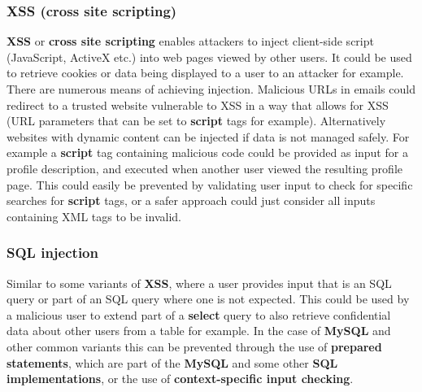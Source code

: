 \documentclass{article}
\newcommand{\np}{\vspace{8pt} \\}
\begin{document}
\subsubsection{XSS (cross site scripting)}
\textbf{XSS} or \textbf{cross site scripting} enables attackers to inject client-side script (JavaScript, ActiveX etc.) into web pages viewed by other users. It could be used to retrieve cookies or data being displayed to a user to an attacker for example. \np
There are numerous means of achieving injection. Malicious URLs in emails could redirect to a trusted website vulnerable to XSS in a way that allows for XSS (URL parameters that can be set to \textbf{script} tags for example). Alternatively websites with dynamic content can be injected if data is not managed safely. For example a \textbf{script} tag containing malicious code could be provided as input for a profile description, and executed when another user viewed the resulting profile page. This could easily be prevented by validating user input to check for specific searches for \textbf{script} tags, or a safer approach could just consider all inputs containing XML tags to be invalid.

\subsubsection{SQL injection}
Similar to some variants of \textbf{XSS}, where a user provides input that is an SQL query or part of an SQL query where one is not expected. This could be used by a malicious user to extend part of a \textbf{select} query to also retrieve confidential data about other users from a table for example. In the case of \textbf{MySQL} and other common variants this can be prevented through the use of \textbf{prepared statements}, which are part of the \textbf{MySQL} and some other \textbf{SQL implementations}, or the use of \textbf{context-specific input checking}.
\end{document}
